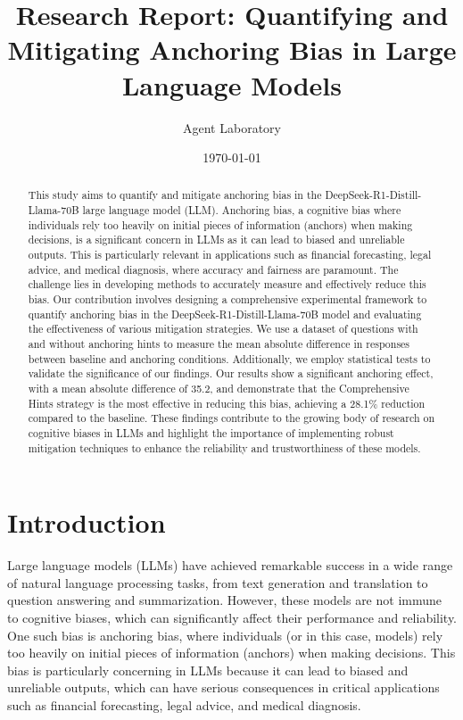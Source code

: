 \documentclass{article}
\title{Research Report: Quantifying and Mitigating Anchoring Bias in Large Language Models}
\author{Agent Laboratory}
\date{\today}
\begin{document}
\maketitle

\begin{abstract}
This study aims to quantify and mitigate anchoring bias in the DeepSeek-R1-Distill-Llama-70B large language model (LLM). Anchoring bias, a cognitive bias where individuals rely too heavily on initial pieces of information (anchors) when making decisions, is a significant concern in LLMs as it can lead to biased and unreliable outputs. This is particularly relevant in applications such as financial forecasting, legal advice, and medical diagnosis, where accuracy and fairness are paramount. The challenge lies in developing methods to accurately measure and effectively reduce this bias. Our contribution involves designing a comprehensive experimental framework to quantify anchoring bias in the DeepSeek-R1-Distill-Llama-70B model and evaluating the effectiveness of various mitigation strategies. We use a dataset of questions with and without anchoring hints to measure the mean absolute difference in responses between baseline and anchoring conditions. Additionally, we employ statistical tests to validate the significance of our findings. Our results show a significant anchoring effect, with a mean absolute difference of 35.2, and demonstrate that the Comprehensive Hints strategy is the most effective in reducing this bias, achieving a 28.1\% reduction compared to the baseline. These findings contribute to the growing body of research on cognitive biases in LLMs and highlight the importance of implementing robust mitigation techniques to enhance the reliability and trustworthiness of these models.
\end{abstract}

\section{Introduction}
Large language models (LLMs) have achieved remarkable success in a wide range of natural language processing tasks, from text generation and translation to question answering and summarization. However, these models are not immune to cognitive biases, which can significantly affect their performance and reliability. One such bias is anchoring bias, where individuals (or in this case, models) rely too heavily on initial pieces of information (anchors) when making decisions. This bias is particularly concerning in LLMs because it can lead to biased and unreliable outputs, which can have serious consequences in critical applications such as financial forecasting, legal advice, and medical diagnosis.
\end{document}
